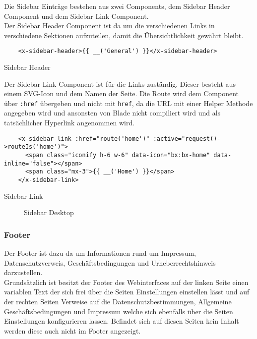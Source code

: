 Die Sidebar Einträge bestehen aus zwei Components, dem Sidebar Header Component
und dem Sidebar Link Component.\\

Der Sidebar Header Component ist da um die verschiedenen Links in verschiedene
Sektionen aufzuteilen, damit die Übersichtlichkeit gewährt bleibt.

\begin{listing}[H]
  \begin{verbatim}
    <x-sidebar-header>{{ __('General') }}</x-sidebar-header>
  \end{verbatim}
  \caption{Sidebar Header}
\end{listing}

Der Sidebar Link Component ist für die Links zuständig. Dieser besteht aus einem
\acs*{SVG}-Icon und dem Namen der Seite. Die Route wird dem Component über
\verb|:href| übergeben und nicht mit \verb|href|, da die URL mit einer Helper Methode
angegeben wird und ansonsten von Blade nicht compiliert wird und als
tatsächlicher Hyperlink angenommen wird.

\begin{listing}[H]
  \begin{verbatim}
    <x-sidebar-link :href="route('home')" :active="request()->routeIs('home')">
      <span class="iconify h-6 w-6" data-icon="bx:bx-home" data-inline="false"></span>
      <span class="mx-3">{{ __('Home') }}</span>
    </x-sidebar-link>
  \end{verbatim}
  \caption{Sidebar Link}
\end{listing}
\begin{figure}[H]
  \centering
  \caption{Sidebar Desktop}
\end{figure}

\subsubsection{Footer}
Der Footer ist dazu da um Informationen rund um Impressum, Datenschutzverweis,
Geschäftsbedingungen und Urheberrechtshinweis darzustellen.\\

Grundsätzlich ist besitzt der Footer des Webinterfaces auf der linken Seite
einen variablen Text der sich frei über die Seiten Einstellungen einstellen
lässt und auf der rechten Seiten Verweise auf die Datenschutzbestimmungen,
Allgemeine Geschäftsbedingungen und Impressum welche sich ebenfalls über die
Seiten Einstellungen konfigurieren lassen. Befindet sich auf diesen Seiten kein
Inhalt werden diese auch nicht im Footer angezeigt.


